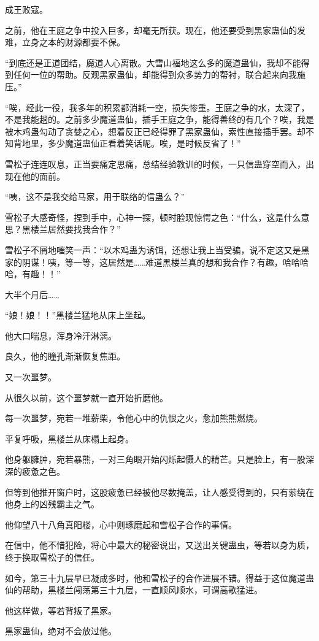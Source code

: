 \begin{this_body}
成王败寇。

之前，他在王庭之争中投入巨多，却毫无所获。现在，他还要受到黑家蛊仙的发难，立身之本的财源都要不保。

“到底还是正道团结，魔道人心离散。大雪山福地这么多的魔道蛊仙，我却不能得到任何一位的帮助。反观黑家蛊仙，却能得到众多势力的帮衬，联合起来向我施压。”

“唉，经此一役，我多年的积累都消耗一空，损失惨重。王庭之争的水，太深了，不是我能趟的。之前多少魔道蛊仙，插手王庭之争，能得善终的有几个？唉，我是被木鸡蛊勾动了贪婪之心，想着反正已经得罪了黑家蛊仙，索性直接插手罢。却不知背地里，多少魔道蛊仙正看着笑话呢。唉，是时候反省了！”

雪松子连连叹息，正当要痛定思痛，总结经验教训的时候，一只信蛊穿空而入，出现在他的面前。

“咦，这不是我交给马家，用于联络的信蛊么？”

雪松子大感奇怪，捏到手中，心神一探，顿时脸现惊愕之色：“什么，这是什么意思？黑楼兰居然要找我合作？”

雪松子不屑地嗤笑一声：“以木鸡蛊为诱饵，还想让我上当受骗，说不定这又是黑家的阴谋！咦，等一等，这居然是……难道黑楼兰真的想和我合作？有趣，哈哈哈哈，有趣！！”

大半个月后……

“娘！娘！！”黑楼兰猛地从床上坐起。

他大口喘息，浑身冷汗淋漓。

良久，他的瞳孔渐渐恢复焦距。

又一次噩梦。

从很久以前，这个噩梦就一直开始折磨他。

每一次噩梦，宛若一堆薪柴，令他心中的仇恨之火，愈加熊熊燃烧。

平复呼吸，黑楼兰从床榻上起身。

他身躯臃肿，宛若暴熊，一对三角眼开始闪烁起慑人的精芒。只是脸上，有一股深深的疲惫之色。

但等到他推开窗户时，这股疲惫已经被他尽数掩盖，让人感受得到的，只有萦绕在他身上的凶残霸主之气。

他仰望八十八角真阳楼，心中则琢磨起和雪松子合作的事情。

在信中，他不惜犯险，将心中最大的秘密说出，又送出关键蛊虫，等若以身为质，终于换取雪松子的信任。

如今，第三十九层早已凝成多时，他和雪松子的合作进展不错。得益于这位魔道蛊仙的帮助，黑楼兰闯荡第三十九层，一直顺风顺水，可谓高歌猛进。

他这样做，等若背叛了黑家。

黑家蛊仙，绝对不会放过他。


\end{this_body}
